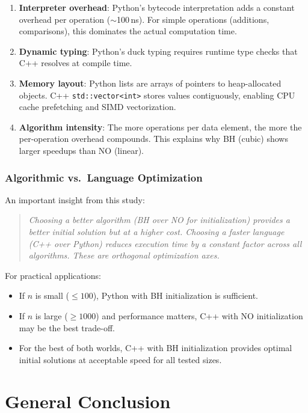 \documentclass[12pt,a4paper]{article}
\begin{document}
\begin{enumerate}
  \item \textbf{Interpreter overhead}: Python's bytecode interpretation adds a constant overhead per operation ($\sim$100\,ns). For simple operations (additions, comparisons), this dominates the actual computation time.
  \item \textbf{Dynamic typing}: Python's duck typing requires runtime type checks that C++ resolves at compile time.
  \item \textbf{Memory layout}: Python lists are arrays of pointers to heap-allocated objects. C++ \texttt{std::vector<int>} stores values contiguously, enabling CPU cache prefetching and SIMD vectorization.
  \item \textbf{Algorithm intensity}: The more operations per data element, the more the per-operation overhead compounds. This explains why BH (cubic) shows larger speedups than NO (linear).
\end{enumerate}

\subsubsection{Algorithmic vs.\ Language Optimization}

An important insight from this study:

\begin{quote}
\textit{Choosing a better algorithm (BH over NO for initialization) provides a better initial solution but at a higher cost. Choosing a faster language (C++ over Python) reduces execution time by a constant factor across all algorithms. These are orthogonal optimization axes.}
\end{quote}

For practical applications:
\begin{itemize}
  \item If $n$ is small ($\leq 100$), Python with BH initialization is sufficient.
  \item If $n$ is large ($\geq 1000$) and performance matters, C++ with NO initialization may be the best trade-off.
  \item For the best of both worlds, C++ with BH initialization provides optimal initial solutions at acceptable speed for all tested sizes.
\end{itemize}

\newpage
\section{General Conclusion}
\end{document}
